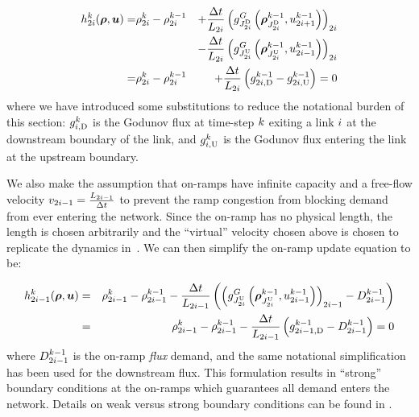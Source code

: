 \begin{eqnarray}
\syseq_{2\link}^{\tind}(\state,\control)= & \discrete{2\link}{\tind}-\discrete{2\link}{\tind-1} & +\dfrac{\Delta t}{\length_{2\link}}\left(\god_{\jdown{2\link}}\left(\juncstate{\jdown{2\link}}{\tind-1},\ramp_{2\link+1}^{\tind-1}\right)\right)_{2\link}\label{eq:rho-update}\\
&  & -\dfrac{\Delta t}{\length_{2\link}}\left(\god_{\jup{2\link}}\left(\juncstate{\jup{2\link}}{\tind-1},\ramp_{2\link-1}^{\tind-1}\right)\right)_{2\link}\nonumber \\
= & \discrete{2\link}{\tind}-\discrete{2\link}{\tind-1} & +\frac{\Delta t}{\length_{2\link}}\left(\fout{2\link}{\tind-1}-\fin{2\link}{\tind-1}\right)=0
\end{eqnarray}
where we have introduced some substitutions to reduce the notational
burden of this section: $g_{i,\text{D}}^{k}$ is the Godunov flux
at time-step $k$ exiting a link $i$ at the downstream boundary
of the link, and $g_{i,\text{U}}^{k}$ is the Godunov flux entering
the link at the upstream boundary.

We also make the assumption that on-ramps have infinite capacity and
a free-flow velocity $v_{2i-1}=\frac{L_{2i-1}}{\Delta t}$
to prevent the ramp congestion from blocking demand from ever entering
the network. Since the on-ramp has no physical length, the length
is chosen arbitrarily and the ``virtual'' velocity chosen above
is chosen to replicate the dynamics in~\cite{Monache2014PdeOde}. We can
then simplify the on-ramp update equation to be:

\begin{eqnarray}
\syseq_{2\link-1}^{\tind}(\state,\control) & = & \discrete{2\link-1}{\tind}-\discrete{2\link-1}{\tind-1}-\frac{\Delta t}{\length_{2\link-1}}\left(\left(\god_{\jup{2\link}}\left(\juncstate{\jup{2\link}}{\tind-1},\ramp_{2\link-1}^{\tind-1}\right)\right)_{2\link-1}-\boundaryDemand{2\link-1}{\tind-1}\right)\label{eq:on-ramp-update}\\
& = & \discrete{2\link-1}{\tind}-\discrete{2\link-1}{\tind-1}-\frac{\Delta t}{\length_{2\link-1}}\left(\fout{2\link-1}{\tind-1}-\boundaryDemand{2\link-1}{\tind-1}\right)=0
\end{eqnarray}
where $D_{2i-1}^{k-1}$ is the on-ramp \emph{flux
}demand, and the same notational simplification has been used for
the downstream flux. This formulation results in ``strong'' boundary
conditions at the on-ramps which guarantees all demand enters the network.
Details on weak versus strong boundary conditions can be found in
\cite{Monache2014PdeOde,strub2006weak,work2010traffic}.

